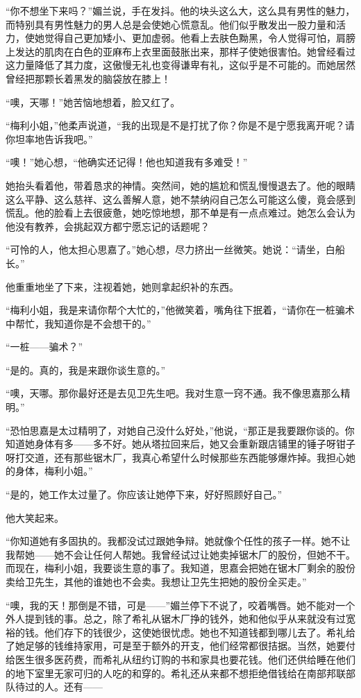 \par “你不想坐下来吗？”媚兰说，手在发抖。他的块头这么大，这么具有男性的魅力，而特别具有男性魅力的男人总是会使她心慌意乱。他们似乎散发出一股力量和活力，使她觉得自己更加矮小、更加虚弱。他看上去肤色黝黑，令人觉得可怕，肩膀上发达的肌肉在白色的亚麻布上衣里面鼓胀出来，那样子使她很害怕。她曾经看过这力量降低了其力度，这傲慢无礼也变得谦卑有礼，这似乎是不可能的。而她居然曾经把那颗长着黑发的脑袋放在膝上！
\par “噢，天哪！”她苦恼地想着，脸又红了。
\par “梅利小姐，”他柔声说道，“我的出现是不是打扰了你？你是不是宁愿我离开呢？请你坦率地告诉我吧。”
\par “噢！”她心想，“他确实还记得！他也知道我有多难受！”
\par 她抬头看着他，带着恳求的神情。突然间，她的尴尬和慌乱慢慢退去了。他的眼睛这么平静、这么慈祥、这么善解人意，她不禁纳闷自己怎么可能这么傻，竟会感到慌乱。他的脸看上去很疲惫，她吃惊地想，那不单是有一点点难过。她怎么会认为他没有教养，会挑起双方都宁愿忘记的话题呢？
\par “可怜的人，他太担心思嘉了。”她心想，尽力挤出一丝微笑。她说：“请坐，白船长。”
\par 他重重地坐了下来，注视着她，她则拿起织补的东西。
\par “梅利小姐，我是来请你帮个大忙的，”他微笑着，嘴角往下抿着，“请你在一桩骗术中帮忙，我知道你是不会想干的。”
\par “一桩——骗术？”
\par “是的。真的，我是来跟你谈生意的。”
\par “噢，天哪。那你最好还是去见卫先生吧。我对生意一窍不通。我不像思嘉那么精明。”
\par “恐怕思嘉是太过精明了，对她自己没什么好处，”他说，“那正是我要跟你谈的。你知道她身体有多——多不好。她从塔拉回来后，她又会重新跟店铺里的锤子呀钳子呀打交道，还有那些锯木厂，我真心希望什么时候那些东西能够爆炸掉。我担心她的身体，梅利小姐。”
\par “是的，她工作太过量了。你应该让她停下来，好好照顾好自己。”
\par 他大笑起来。
\par “你知道她有多固执的。我都没试过跟她争辩。她就像个任性的孩子一样。她不让我帮她——她不会让任何人帮她。我曾经试过让她卖掉锯木厂的股份，但她不干。而现在，梅利小姐，我要谈生意的事了。我知道，思嘉会把她在锯木厂剩余的股份卖给卫先生，其他的谁她也不会卖。我想让卫先生把她的股份全买走。”
\par “噢，我的天！那倒是不错，可是——”媚兰停下不说了，咬着嘴唇。她不能对一个外人提到钱的事。总之，除了希礼从锯木厂挣的钱外，她和他似乎从来就没有过宽裕的钱。他们存下的钱很少，这使她很忧虑。她也不知道钱都到哪儿去了。希礼给了她足够的钱维持家用，可是至于额外的开支，他们经常都很拮据。当然，她要付给医生很多医药费，而希礼从纽约订购的书和家具也要花钱。他们还供给睡在他们的地下室里无家可归的人吃的和穿的。希礼还从来都不想拒绝借钱给在南部邦联部队待过的人。还有——
